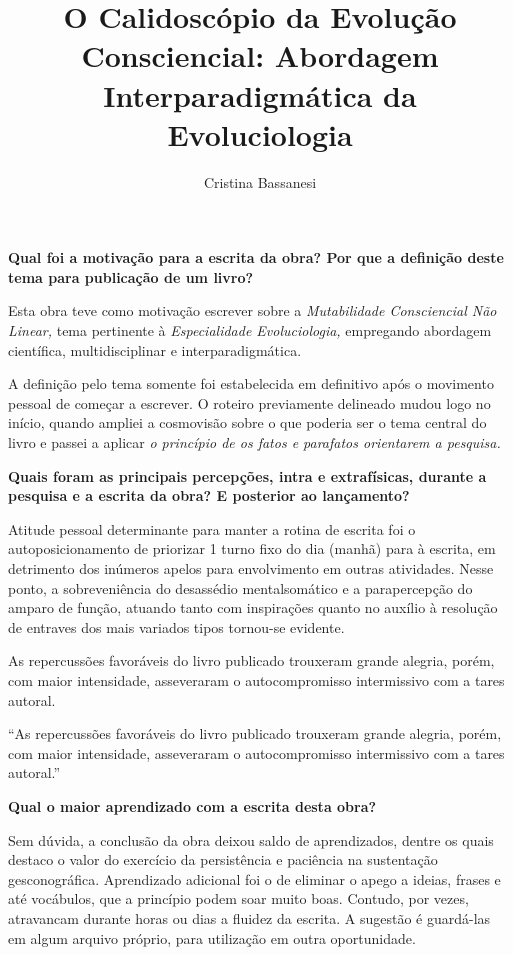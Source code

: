 \documentclass{gescons}
\author{Cristina Bassanesi}
\title{O Calidoscópio da Evolução Consciencial: Abordagem Interparadigmática da Evoluciologia}
\begin{document}
    \makeentrevistatitle

    \begin{multicols}{2}

\textbf{Qual foi a motivação para a escrita da obra? Por que a definição deste tema para publicação de um livro?}

Esta obra teve como motivação escrever sobre a \textit{Mutabilidade Consciencial Não Linear,} tema pertinente à \textit{Especialidade Evoluciologia,} empregando abordagem científica, multidisciplinar e interparadigmática.

A definição pelo tema somente foi estabelecida em definitivo após o movimento pessoal de começar a escrever. O roteiro previamente delineado mudou logo no início, quando ampliei a cosmovisão sobre o que poderia ser o tema central do livro e passei a aplicar \textit{o princípio de os fatos e parafatos orientarem a pesquisa.}

\textbf{Quais foram as principais percepções, intra e extrafísicas, durante a pesquisa e a escrita da obra? E posterior ao lançamento?}

Atitude pessoal determinante para manter a rotina de escrita foi o autoposicionamento de priorizar 1 turno fixo do dia (manhã) para à escrita, em detrimento dos inúmeros apelos para envolvimento em outras atividades. Nesse ponto, a sobreveniência do desassédio mentalsomático e a parapercepção do amparo de função, atuando tanto com inspirações quanto no auxílio à resolução de entraves dos mais variados tipos tornou-se evidente.

As repercussões favoráveis do livro publicado trouxeram grande alegria, porém, com maior intensidade, asseveraram o autocompromisso intermissivo com a tares autoral. 

\begin{pullquote}
``As repercussões favoráveis do livro publicado trouxeram grande alegria, porém, com maior intensidade, asseveraram o autocompromisso intermissivo com a tares autoral.''
\end{pullquote}

\textbf{Qual o maior aprendizado com a escrita desta obra?}

Sem dúvida, a conclusão da obra deixou saldo de aprendizados, dentre os quais destaco o valor do exercício da persistência e paciência na sustentação gesconográfica. Aprendizado adicional foi o de eliminar o apego a ideias, frases e até vocábulos, que a princípio podem soar muito boas. Contudo, por vezes, atravancam durante horas ou dias a fluidez da escrita. A sugestão é guardá-las em algum arquivo próprio, para utilização em outra oportunidade. 


\end{multicols}
\end{document}
